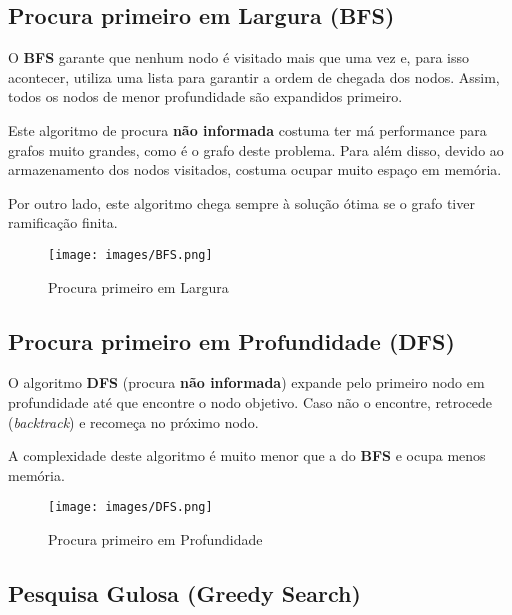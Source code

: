 \documentclass[a4paper,12pt]{report}
\begin{document}
\subsection{Procura primeiro em Largura (BFS)}
\label{Procura primeiro em Largura (BFS)}

O \textbf{BFS} garante que nenhum nodo é visitado mais que uma vez e, para isso acontecer, utiliza uma lista para garantir a ordem de chegada dos nodos. Assim, todos os nodos de menor profundidade são expandidos primeiro.
\par Este algoritmo de procura \textbf{não informada} costuma ter má performance para grafos muito grandes, como é o grafo deste problema. Para além disso, devido ao armazenamento dos nodos visitados, costuma ocupar muito espaço em memória. 
\par Por outro lado, este algoritmo chega sempre à solução ótima se o grafo tiver ramificação finita. 

\begin{figure}[H]
    \centering
    \texttt{[image: images/BFS.png]}
    \caption{Procura primeiro em Largura}
    \label{fig:BFS}
\end{figure}

\vspace{5cm}

\subsection{Procura primeiro em Profundidade (DFS)}
\label{Procura primeiro em Profundidade (DFS)}

O algoritmo \textbf{DFS} (procura \textbf{não informada}) expande pelo primeiro nodo em profundidade até que encontre o nodo objetivo. Caso não o encontre, retrocede (\textit{backtrack}) e recomeça no próximo nodo.
\par A complexidade deste algoritmo é muito menor que a do \textbf{BFS} e ocupa menos memória.

\begin{figure}[H]
    \centering
    \texttt{[image: images/DFS.png]}
    \caption{Procura primeiro em Profundidade}
    \label{fig:DFS}
\end{figure}

\vspace{20cm}

\subsection{Pesquisa Gulosa (Greedy Search)}
\label{Pesquisa Gulosa (Greedy Search)}
\end{document}
